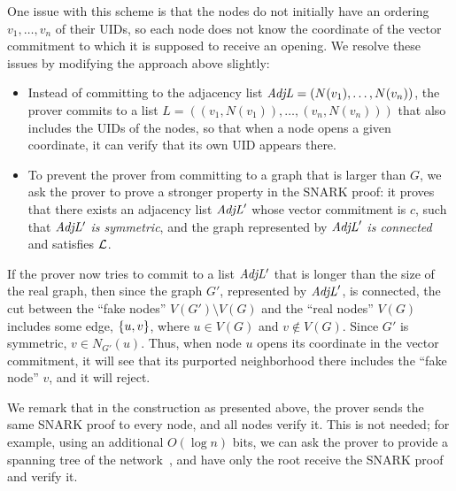 One issue with this scheme is that the nodes do not initially have an ordering $v_1,\ldots,v_n$ of their UIDs, so each node does not know the coordinate of the vector commitment to which it is supposed to receive an opening. %
We resolve these issues by modifying the approach above slightly:
\begin{itemize}
    \item Instead of committing to the adjacency list $\mathit{ AdjL } = (N(v_1),\ldots,N(v_n))$, the prover commits to a list $L = ( (v_1, N(v_1) ), \ldots, (v_n, N(v_n)) )$ that also includes the UIDs of the nodes, so that when a node opens a given coordinate, it can verify that its own UID appears there.
    \item To prevent the prover from committing to a graph that is larger than $G$, we ask the prover to prove a stronger property in the SNARK proof: it proves that there exists an adjacency list $\mathit{ AdjL }'$ whose vector commitment is $c$, such that $\mathit{ AdjL' }$ \emph{is symmetric}, and the graph represented by $\mathit{ AdjL }'$ \emph{is connected} and satisfies $\mathcal{L}$.
\end{itemize}
If the prover now tries to commit to a list $\mathit{ AdjL' }$ that is longer than the size of the real graph, then since the graph $G'$, represented by $\mathit{ AdjL }'$, is connected, the cut between the ``fake nodes'' $V(G') \setminus V(G)$ and the ``real nodes'' $V(G)$ includes some edge, $\left \{{u,v} \right \}$, where $u \in V(G)$ and $v \not \in V(G)$. Since $G'$ is symmetric, $v \in N_{G'}(u)$. Thus, when node $u$ opens its coordinate in the vector commitment, it will see that its purported neighborhood there includes the ``fake node'' $v$, and it will reject.

	We remark that in the construction as presented above, the prover sends the same SNARK proof to every node,
	and all nodes verify it. This is not needed;
	for example, 
	using an additional $O(\log n)$ bits,
	we can ask the prover to provide a spanning tree of the network~\cite{korman2005proof},
	and have only the root receive the SNARK proof and verify it.

